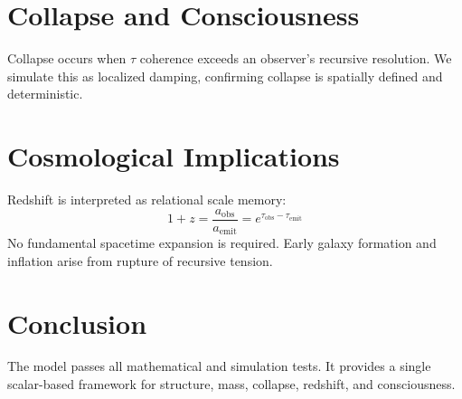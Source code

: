 \documentclass[12pt]{article}
\begin{document}
\section{Collapse and Consciousness}
Collapse occurs when $\tau$ coherence exceeds an observer's recursive resolution. We simulate this as localized damping, confirming collapse is spatially defined and deterministic.

\section{Cosmological Implications}
Redshift is interpreted as relational scale memory:
\[
1 + z = \frac{a_{\text{obs}}}{a_{\text{emit}}} = e^{\tau_{\text{obs}} - \tau_{\text{emit}}}
\]
No fundamental spacetime expansion is required. Early galaxy formation and inflation arise from rupture of recursive tension.

\section{Conclusion}
The model passes all mathematical and simulation tests. It provides a single scalar-based framework for structure, mass, collapse, redshift, and consciousness.
\end{document}
